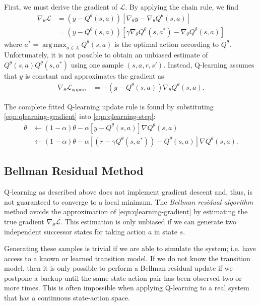 \documentclass[11pt]{article}
\numberwithin{equation}{section}
\numberwithin{figure}{section}
\DeclareMathOperator*{\argmax}{arg\,max}
\begin{document}
First, we must derive the gradient of $\mathcal{L}$. By applying the chain
rule, we find
\begin{align*}
    \nabla_\theta \mathcal{L} &= \left(y - Q^\theta(s, a)\right) \left[
                                      \nabla_\theta y
                                    - \nabla_\theta Q^\theta(s, a) \right] \\
                              &= \left(y - Q^\theta(s, a)\right) \left[
                                      \gamma \nabla_\theta Q^\theta(s, a^*)
                                    - \nabla_\theta Q^\theta(s, a) \right]
\end{align*}
where $a^* = \argmax_{a \in A} Q^\theta(s, a)$ is the optimal action according
to $Q^\theta$. Unfortunately, it is not possible to obtain an unbiased estimate
of $Q^\theta(s, a) Q^\theta(s, a^*)$ using one sample $(s, a, r, s')$. Instead,
Q-learning assumes that $y$ is constant and approximates the gradient as
\begin{align}
    \nabla_\theta \mathcal{L}_\text{approx} &= -\left(y - Q^\theta(s, a)\right)
                                       \nabla_\theta Q^\theta(s, a).
    \label{eqn:qlearning-gradient}
\end{align}

The complete fitted Q-learning update rule is found by substituting
\cref{eqn:qlearning-gradient} into \cref{eqn:qlearning-step}:
\begin{align*}
    \theta &\gets (1 - \alpha) \theta - \alpha \left[
                y - Q^\theta(s, a)\right] \nabla Q^\theta (s, a) \\
           &\gets (1 - \alpha) \theta - \alpha \left[
                \left( r - \gamma Q^\theta(s, a^*) \right)
                - Q^\theta(s, a)\right] \nabla Q^\theta (s, a).
\end{align*}

\subsection{Bellman Residual Method}
Q-learning as described above does not implement gradient descent and, thus, is
not guaranteed to converge to a local minimum. The \emph{Bellman residual
algorithm} method avoids the approximation of \cref{eqn:qlearning-gradient} by
estimating the true gradient $\nabla_\theta \mathcal{L}$. This estimation is
only unbiased if we can generate two independent successor states for taking
action $a$ in state $s$.

Generating these samples is trivial if we are able to simulate the system; i.e.
have access to a known or learned transition model. If we do not know the
transition model, then it is only possible to perform a Bellman residual update
if we postpone a backup until the same state-action pair has been observed two
or more times. This is often impossible when applying Q-learning to a real system
that has a continuous state-action space.
\end{document}
